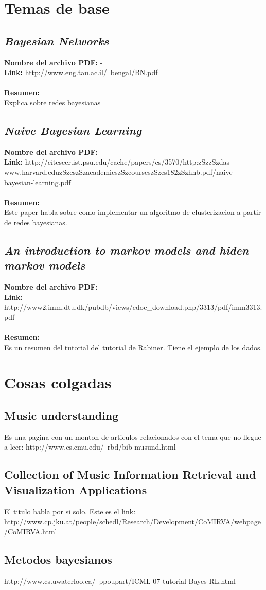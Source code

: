 \documentclass[a4paper,10pt]{article}
\newcommand{\titulo}[1]{\def\Titulo{#1}}
\newcommand{\resumen}[1]{\def\Resumen{#1}}
\newcommand{\link}[1]{\def\Link{#1}}
\newenvironment{resumenpaper}{
\let\Titulo\empty
\let\Resumen\empty
\let\Archivo-
\let\Link-
\let\Id\empty
}{
\subsection{\textit{\Titulo}}
\label{\Id}
\noindent \textbf{Nombre del archivo PDF: }{\Archivo}\\
\noindent \textbf{Link: }{\Link}\\ \\
\noindent \textbf{Resumen:} \\ {\Resumen}
}
\begin{document}
\section{Temas de base}
\begin{resumenpaper}
 \titulo{Bayesian Networks}
 \link{http://www.eng.tau.ac.il/~bengal/BN.pdf}
 \resumen{Explica sobre redes bayesianas}
\end{resumenpaper}

\begin{resumenpaper}
 \titulo{Naive Bayesian Learning}
 \link{http://citeseer.ist.psu.edu/cache/papers/cs/3570/http:zSzzSzdas-www.harvard.eduzSzcszSzacademicszSzcourseszSzcs182zSzhnb.pdf/naive-bayesian-learning.pdf}
 \resumen{Este paper habla sobre como implementar un algoritmo de clusterizacion a partir de redes bayesianas.}
\end{resumenpaper}

\begin{resumenpaper}
 \titulo{An introduction to markov models and hiden markov models}
 \link{http://www2.imm.dtu.dk/pubdb/views/edoc\_download.php/3313/pdf/imm3313.pdf}
 \resumen{Es un resumen del tutorial del tutorial de Rabiner. Tiene el ejemplo de los dados.}
\end{resumenpaper}


\section{Cosas colgadas}
\subsection{Music understanding}
Es una pagina con un monton de articulos relacionados con el tema que no llegue a leer: http://www.cs.cmu.edu/~rbd/bib-musund.html

\subsection{Collection of Music Information Retrieval and Visualization Applications}
El titulo habla por si solo. Este es el link: http://www.cp.jku.at/people/schedl/Research/Development/CoMIRVA/webpage/CoMIRVA.html

\subsection{Metodos bayesianos}
http://www.cs.uwaterloo.ca/~ppoupart/ICML-07-tutorial-Bayes-RL.html
\end{document}
